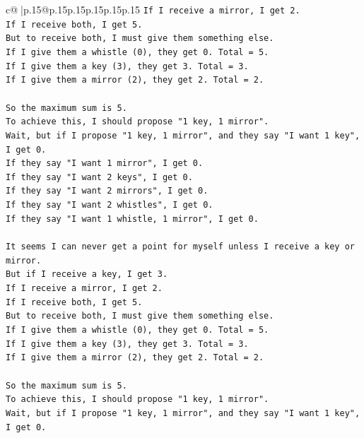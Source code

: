 \documentclass{article}
\begin{document}
{\begin{supertabular}{c@{$\;$}|p{.15\linewidth}@{}p{.15\linewidth}p{.15\linewidth}p{.15\linewidth}p{.15\linewidth}p{.15\linewidth}}
{{{\texttt{If I receive a mirror, I get 2.} \\
\texttt{If I receive both, I get 5.} \\
\texttt{But to receive both, I must give them something else.} \\
\texttt{If I give them a whistle (0), they get 0. Total = 5.} \\
\texttt{If I give them a key (3), they get 3. Total = 3.} \\
\texttt{If I give them a mirror (2), they get 2. Total = 2.} \\
\\ 
\texttt{So the maximum sum is 5.} \\
\texttt{To achieve this, I should propose "1 key, 1 mirror".} \\
\texttt{Wait, but if I propose "1 key, 1 mirror", and they say "I want 1 key", I get 0.} \\
\texttt{If they say "I want 1 mirror", I get 0.} \\
\texttt{If they say "I want 2 keys", I get 0.} \\
\texttt{If they say "I want 2 mirrors", I get 0.} \\
\texttt{If they say "I want 2 whistles", I get 0.} \\
\texttt{If they say "I want 1 whistle, 1 mirror", I get 0.} \\
\\ 
\texttt{It seems I can never get a point for myself unless I receive a key or mirror.} \\
\texttt{But if I receive a key, I get 3.} \\
\texttt{If I receive a mirror, I get 2.} \\
\texttt{If I receive both, I get 5.} \\
\texttt{But to receive both, I must give them something else.} \\
\texttt{If I give them a whistle (0), they get 0. Total = 5.} \\
\texttt{If I give them a key (3), they get 3. Total = 3.} \\
\texttt{If I give them a mirror (2), they get 2. Total = 2.} \\
\\ 
\texttt{So the maximum sum is 5.} \\
\texttt{To achieve this, I should propose "1 key, 1 mirror".} \\
\texttt{Wait, but if I propose "1 key, 1 mirror", and they say "I want 1 key", I get 0.} \\
}}}
\end{supertabular}}
\end{document}
